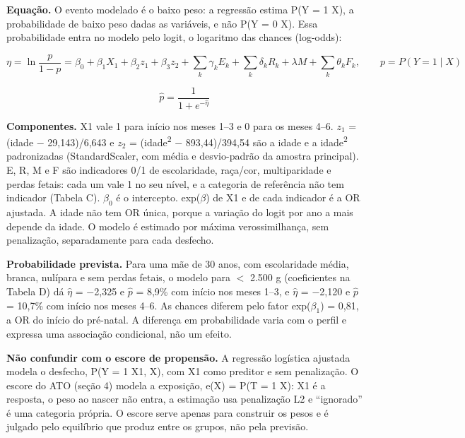 \documentclass[10pt,a4paper]{article}
\newcommand{\menos}{\ensuremath{-}}
\newcommand{\menor}{\ensuremath{<}}
\begin{document}
{\color{iptescuro}\bfseries Equação.} O evento modelado é o baixo peso: a regressão estima P(Y = 1 \textbar{} X), a probabilidade de baixo peso dadas as variáveis, e não P(Y = 0 \textbar{} X). Essa probabilidade entra no modelo pelo logit, o logaritmo das chances (log-odds):\par

\[\eta=\ln\frac{p}{1-p}=\beta_0+\beta_1X_1+\beta_2z_1+\beta_3z_2+\sum_k\gamma_kE_k+\sum_k\delta_kR_k+\lambda M+\sum_k\theta_kF_k,\qquad p=P(Y=1\mid X)\]

\[\hat p=\frac{1}{1+e^{-\hat\eta}}\]

{\color{iptescuro}\bfseries Componentes.} X1 vale 1 para início nos meses 1--3 e 0 para os meses 4--6. \ensuremath{z_1} = (idade \menos{} 29,143)/6,643 e \ensuremath{z_2} = (idade\textsuperscript{2} \menos{} 893,44)/394,54 são a idade e a idade\textsuperscript{2} padronizadas (StandardScaler, com média e desvio-padrão da amostra principal). E, R, M e F são indicadores 0/1 de escolaridade, raça/cor, multiparidade e perdas fetais: cada um vale 1 no seu nível, e a categoria de referência não tem indicador (Tabela C). \ensuremath{\beta_0} é o intercepto. exp(\ensuremath{\beta}) de X1 e de cada indicador é a OR ajustada. A idade não tem OR única, porque a variação do logit por ano a mais depende da idade. O modelo é estimado por máxima verossimilhança, sem penalização, separadamente para cada desfecho.\par

{\color{iptescuro}\bfseries Probabilidade prevista.} Para uma mãe de 30 anos, com escolaridade média, branca, nulípara e sem perdas fetais, o modelo para \menor{} 2.500 g (coeficientes na Tabela D) dá \ensuremath{\hat\eta} = \menos{}2,325 e \ensuremath{\hat p} = 8,9\% com início nos meses 1--3, e \ensuremath{\hat\eta} = \menos{}2,120 e \ensuremath{\hat p} = 10,7\% com início nos meses 4--6. As chances diferem pelo fator exp(\ensuremath{\beta_1}) = 0,81, a OR do início do pré-natal. A diferença em probabilidade varia com o perfil e expressa uma associação condicional, não um efeito.\par

\begin{caixa}{\color{iptescuro}\bfseries Não confundir com o escore de propensão.} A regressão logística ajustada modela o desfecho, P(Y = 1 \textbar{} X1, X), com X1 como preditor e sem penalização. O escore do ATO (seção 4) modela a exposição, e(X) = P(T = 1 \textbar{} X): X1 é a resposta, o peso ao nascer não entra, a estimação usa penalização L2 e ``ignorado'' é uma categoria própria. O escore serve apenas para construir os pesos e é julgado pelo equilíbrio que produz entre os grupos, não pela previsão.\end{caixa}
\end{document}
